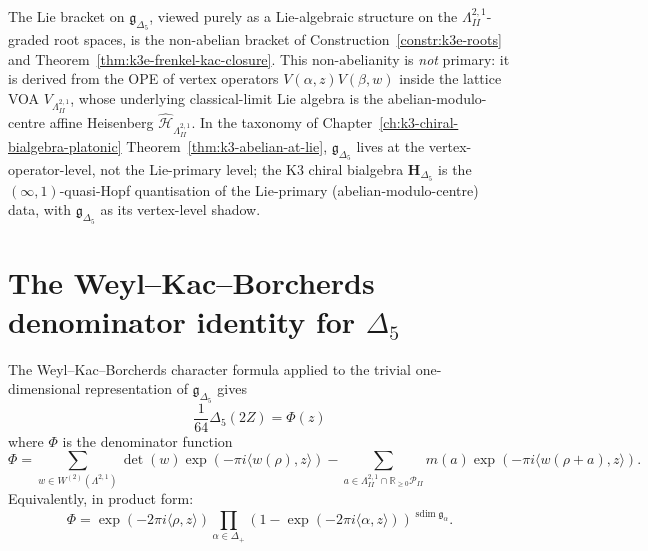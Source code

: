 \begin{remark}
\label{rem:k3e-abelian-at-lie-vertex}
The Lie bracket on $\mathfrak{g}_{\Delta_5}$, viewed purely as a
Lie-algebraic structure on the $\Lambda^{2,1}_{II}$-graded root spaces, is the
non-abelian bracket of Construction~\ref{constr:k3e-roots} and
Theorem~\ref{thm:k3e-frenkel-kac-closure}. This non-abelianity is \emph{not}
primary: it is derived from the OPE of vertex operators
$V(\alpha,z)V(\beta,w)$ inside the lattice VOA
$V_{\Lambda^{2,1}_{II}}$, whose underlying classical-limit Lie algebra is the
abelian-modulo-centre affine Heisenberg
$\widehat{\mathcal{H}}_{\Lambda^{2,1}_{II}}$. In the taxonomy of
Chapter~\ref{ch:k3-chiral-bialgebra-platonic}
Theorem~\ref{thm:k3-abelian-at-lie}, $\mathfrak{g}_{\Delta_5}$ lives at the
vertex-operator-level, not the Lie-primary level; the K3 chiral bialgebra
$\mathbf{H}_{\Delta_5}$ is the $(\infty,1)$-quasi-Hopf quantisation of the
Lie-primary (abelian-modulo-centre) data, with $\mathfrak{g}_{\Delta_5}$ as
its vertex-level shadow.
\end{remark}

\section{The Weyl--Kac--Borcherds denominator identity for \texorpdfstring{$\Delta_5$}{Delta-5}}
\label{sec:k3e-denominator}

\begin{theorem}
\label{thm:k3e-denominator}
The Weyl--Kac--Borcherds character formula applied to the trivial one-dimensional representation of $\mathfrak{g}_{\Delta_5}$ gives
\[
 \frac{1}{64} \Delta_5(2Z) = \Phi(z)
\]
where $\Phi$ is the denominator function
\[
 \Phi = \sum_{w \in W^{(2)}(\Lambda^{2,1})} \det(w) \exp(-\pi i \langle w(\rho), z \rangle) - \sum_{a \in \Lambda^{2,1}_{II} \cap \mathbb{R}_{\geq 0} \mathcal{P}_{II}} m(a) \exp(-\pi i \langle w(\rho + a), z \rangle).
\]
Equivalently, in product form:
\[
 \Phi = \exp(-2\pi i \langle \rho, z \rangle) \prod_{\alpha \in \Delta_+} (1 - \exp(-2\pi i \langle \alpha, z \rangle))^{\operatorname{sdim}\mathfrak g_\alpha}.
\]
\end{theorem}

